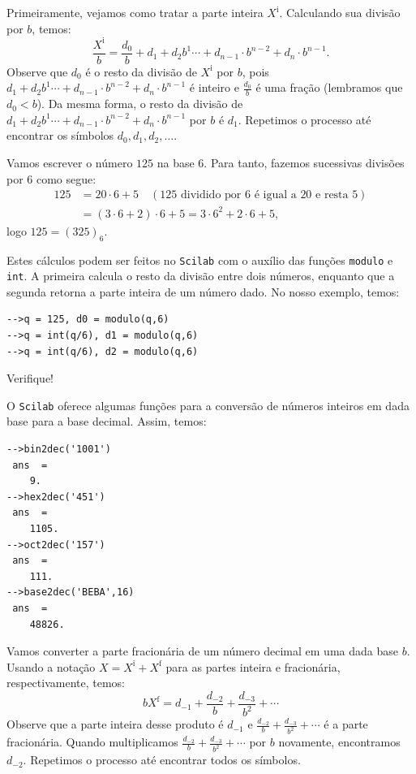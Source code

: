 Primeiramente, vejamos como tratar a parte inteira $X^{\mbox{i}}$. Calculando sua divisão por $b$, temos:
\begin{equation*}
  \frac{X^{\mbox{i}}}{b}=   \frac{d_0}{b}+d_1+d_2 b^1\cdots+d_{n-1}\cdot b^{n-2} +d_n\cdot b^{n-1}.  
\end{equation*}
Observe que $d_0$ é o resto da divisão de $X^{\mbox{i}}$ por $b$, pois $d_1+d_2 b^1\cdots+d_{n-1}\cdot b^{n-2} +d_n\cdot b^{n-1}$ é inteiro e $\frac{d_0}{b}$ é uma fração (lembramos que $d_0<b$). Da mesma forma, o resto da divisão de $d_1+d_2 b^1\cdots+d_{n-1}\cdot b^{n-2} +d_n\cdot b^{n-1}$ por $b$ é $d_1$. Repetimos o processo até encontrar os símbolos $d_0, d_1, d_2, \ldots$.

\begin{ex} Vamos escrever o número $125$ na base $6$. Para tanto, fazemos sucessivas divisões por $6$ como segue:
  \begin{align*}
    125 &= 20\cdot 6 + 5\quad(\mbox{$125$ dividido por $6$ é igual a $20$ e resta $5$})\\
    &= (3\cdot 6 + 2)\cdot 6 + 5 = 3\cdot 6^2 + 2\cdot 6 + 5,
  \end{align*}
logo $125 = (325)_6$.

\ifisscilab
Estes cálculos podem ser feitos no \verb+Scilab+ com o auxílio das funções \verb'modulo' e \verb'int'. A primeira calcula o resto da divisão entre dois números, enquanto que a segunda retorna a parte inteira de um número dado. No nosso exemplo, temos:
\begin{verbatim}
-->q = 125, d0 = modulo(q,6)
-->q = int(q/6), d1 = modulo(q,6)
-->q = int(q/6), d2 = modulo(q,6)
\end{verbatim}
Verifique!
\fi
\end{ex}

\ifisscilab
\begin{ex}[Scilab]
  O \verb+Scilab+ oferece algumas funções para a conversão de números inteiros em dada base para a base decimal. Assim, temos:
\begin{verbatim}
-->bin2dec('1001')
 ans  =
    9.  
-->hex2dec('451')
 ans  =
    1105.  
-->oct2dec('157')
 ans  =
    111.
-->base2dec('BEBA',16)
 ans  =
    48826.  
\end{verbatim}
\end{ex}
\fi

Vamos converter a parte fracionária de um número decimal em uma dada base $b$. Usando a notação $X = X^{\mbox{i}} + X^{\mbox{f}}$ para as partes inteira e fracionária, respectivamente, temos:
\begin{equation*}
  bX^{\mbox{f}}=d_{-1}+\frac{d_{-2}}{b}+\frac{d_{-3}}{b^2}+\cdots  
\end{equation*}
Observe que a parte inteira desse produto é $d_{-1}$ e $\frac{d_{-2}}{b}+\frac{d_{-3}}{b^2}+\cdots$ é a parte fracionária. Quando multiplicamos $\frac{d_{-2}}{b}+\frac{d_{-3}}{b^2}+\cdots$ por $b$ novamente, encontramos $d_{-2}$. Repetimos o processo até encontrar todos os símbolos.

